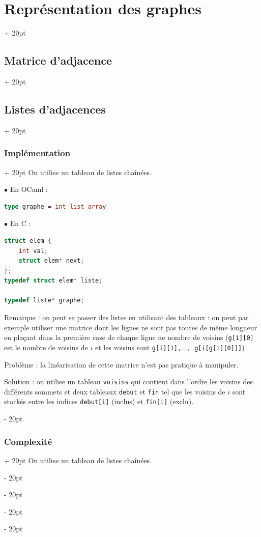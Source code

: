 \documentclass[a4paper, 12pt, twoside]{article}
\newcommand{\ind}[1][20pt]{\advance\leftskip + #1}
\newcommand{\deind}[1][20pt]{\advance\leftskip - #1}
\newenvironment{indt}[2][20pt]{#2 \par \ind[#1]}{\par \deind} %
\begin{document}
\begin{indt}{\section{Représentation des graphes}}
\begin{indt}{\subsection{Matrice d'adjacence}}
\begin{indt}{\subsection{Listes d'adjacences}}
                \vspace{12pt}
                
                \begin{indt}{\subsubsection{Implémentation}}
                    On utilise un tableau de listes chaînées.

                    $\bullet$ En OCaml :

                    \begin{lstlisting}[language=Caml, xleftmargin=100pt]
type graphe = int list array\end{lstlisting}

                    $\bullet$ En C :

                    \begin{lstlisting}[language=C, xleftmargin=100pt]
struct elem {
    int val;
    struct elem* next;
};
typedef struct elem* liste;

typedef liste* graphe;\end{lstlisting}
                    
                    \vspace{6pt}
                    
                    Remarque : on peut se passer des listes en utilisant des tableaux : on peut par exemple utiliser une matrice dont les lignes ne sont pas toutes de même longueur en plaçant dans la première case de chaque ligne ne nombre de voisins (\texttt{g[i][0]} est le nombre de voisins de $i$ et les voisins sont \texttt{g[i][1],$\ldots$, g[i[g[i][0]]]})

                    Problème : la linéarisation de cette matrice n'est pas pratique à manipuler.

                    Solution : on utilise un tableau \texttt{voisins} qui contient dans l'ordre les voisins des différents sommets et deux tableaux \texttt{debut} et \texttt{fin} tel que les voisins de $i$ sont stockés entre les indices \texttt{debut[i]} (inclus) et \texttt{fin[i]} (exclu).
                \end{indt}

                \vspace{12pt}
                
                \begin{indt}{\subsubsection{Complexité}}
                    On utilise un tableau de listes chaînées.


\end{indt}
\end{indt}
\end{indt}
\end{indt}
\end{document}

